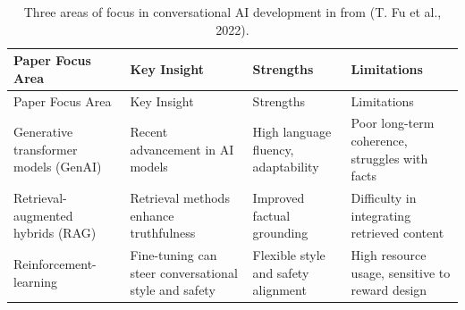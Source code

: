 \documentclass[
  12pt,
  letterpaper,
  DIV=11,
  numbers=noendperiod]{scrartcl}
\begin{document}
\begin{longtable}[]{@{}
  >{\raggedright\arraybackslash}p{}
  >{\raggedright\arraybackslash}p{}
  >{\raggedright\arraybackslash}p{}
  >{\raggedright\arraybackslash}p{}@{}}
\caption[Areas of Focus in Conversational AI Development]{Three areas of
focus in conversational AI development in from (T. Fu et al.,
2022).}\tabularnewline
\toprule\noalign{}
\begin{minipage}[b]{\linewidth}\raggedright
Paper Focus Area
\end{minipage} & \begin{minipage}[b]{\linewidth}\raggedright
Key Insight
\end{minipage} & \begin{minipage}[b]{\linewidth}\raggedright
Strengths
\end{minipage} & \begin{minipage}[b]{\linewidth}\raggedright
Limitations
\end{minipage} \\
\midrule\noalign{}
\endfirsthead
\toprule\noalign{}
\begin{minipage}[b]{\linewidth}\raggedright
Paper Focus Area
\end{minipage} & \begin{minipage}[b]{\linewidth}\raggedright
Key Insight
\end{minipage} & \begin{minipage}[b]{\linewidth}\raggedright
Strengths
\end{minipage} & \begin{minipage}[b]{\linewidth}\raggedright
Limitations
\end{minipage} \\
\midrule\noalign{}
\endhead
\bottomrule\noalign{}
\endlastfoot
Generative transformer models (GenAI) & Recent advancement in AI models
& High language fluency, adaptability & Poor long-term coherence,
struggles with facts \\
Retrieval-augmented hybrids (RAG) & Retrieval methods enhance
truthfulness & Improved factual grounding & Difficulty in integrating
retrieved content \\
Reinforcement-learning & Fine-tuning can steer conversational style and
safety & Flexible style and safety alignment & High resource usage,
sensitive to reward design \\
\end{longtable}
\end{document}
